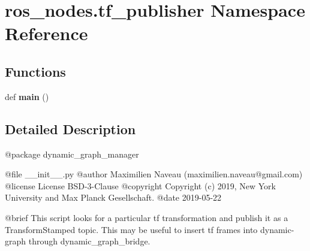 \hypertarget{namespaceros__nodes_1_1tf__publisher}{}\section{ros\+\_\+nodes.\+tf\+\_\+publisher Namespace Reference}
\label{namespaceros__nodes_1_1tf__publisher}
\subsection*{Functions}
\begin{DoxyCompactItemize}
\item 
def {\bfseries main} ()\hypertarget{namespaceros__nodes_1_1tf__publisher_a6c8a5630a90709f276eb25ca0e58b4bb}{}\label{namespaceros__nodes_1_1tf__publisher_a6c8a5630a90709f276eb25ca0e58b4bb}

\end{DoxyCompactItemize}


\subsection{Detailed Description}
\begin{DoxyVerb}@package dynamic_graph_manager

@file __init__.py
@author Maximilien Naveau (maximilien.naveau@gmail.com)
@license License BSD-3-Clause
@copyright Copyright (c) 2019, New York University and Max Planck Gesellschaft.
@date 2019-05-22

@brief This script looks for a particular tf transformation
and publish it as a TransformStamped topic.
This may be useful to insert tf frames into dynamic-graph
through dynamic_graph_bridge.\end{DoxyVerb}
 